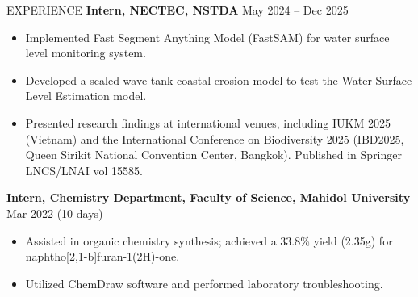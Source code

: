\documentclass[11pt]{resume} %
\begin{document}
\begin{rSection}{EXPERIENCE}
    \textbf{Intern, NECTEC, NSTDA} \hfill {May 2024 – Dec 2025}
     \begin{itemize}
        \item Implemented Fast Segment Anything Model (FastSAM) for water surface level monitoring system.
        \item Developed a scaled wave-tank coastal erosion model to test the Water Surface Level Estimation model.
        \item Presented research findings at international venues, including IUKM 2025 (Vietnam) and the International Conference on Biodiversity 2025 (IBD2025, Queen Sirikit National Convention Center, Bangkok). Published in Springer LNCS/LNAI vol 15585.
    \end{itemize}
    \vspace{0.em}

    \textbf{Intern, Chemistry Department, Faculty of Science, Mahidol University} \hfill {Mar 2022 (10 days)}
     \begin{itemize}
        \item Assisted in organic chemistry synthesis; achieved a 33.8\% yield (2.35g) for naphtho[2,1-b]furan-1(2H)-one.

        \item Utilized ChemDraw software and performed laboratory troubleshooting.
    \end{itemize}

    
\end{rSection}
\end{document}
